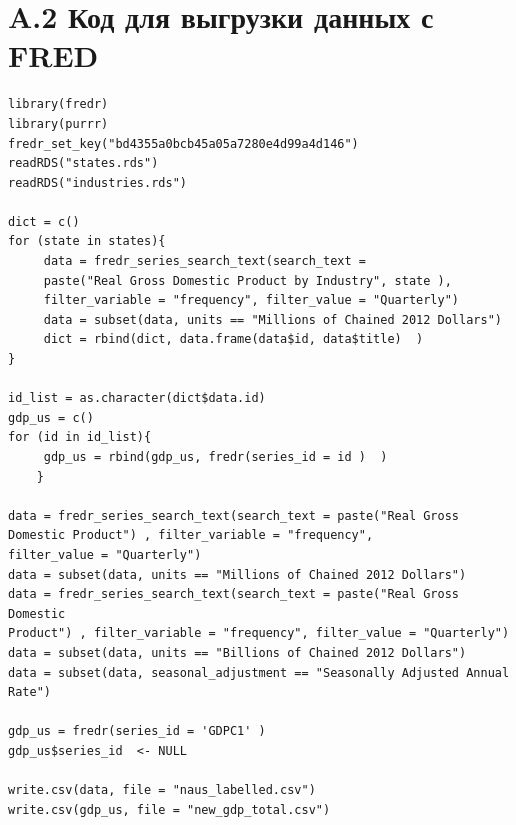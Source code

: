 \documentclass[12pt,a4paper, oneside]{extreport}
\begin{document}
\section*{A.2 Код для выгрузки данных с FRED }

\begin{verbatim}
library(fredr)
library(purrr)
fredr_set_key("bd4355a0bcb45a05a7280e4d99a4d146")
readRDS("states.rds")
readRDS("industries.rds")

dict = c()
for (state in states){
     data = fredr_series_search_text(search_text = 
     paste("Real Gross Domestic Product by Industry", state ), 
     filter_variable = "frequency", filter_value = "Quarterly") 
     data = subset(data, units == "Millions of Chained 2012 Dollars")
     dict = rbind(dict, data.frame(data$id, data$title)  )
}

id_list = as.character(dict$data.id)
gdp_us = c()
for (id in id_list){
     gdp_us = rbind(gdp_us, fredr(series_id = id )  )
	}

data = fredr_series_search_text(search_text = paste("Real Gross 
Domestic Product") , filter_variable = "frequency", 
filter_value = "Quarterly") 
data = subset(data, units == "Millions of Chained 2012 Dollars")
data = fredr_series_search_text(search_text = paste("Real Gross Domestic 
Product") , filter_variable = "frequency", filter_value = "Quarterly") 
data = subset(data, units == "Billions of Chained 2012 Dollars")
data = subset(data, seasonal_adjustment == "Seasonally Adjusted Annual Rate")

gdp_us = fredr(series_id = 'GDPC1' ) 
gdp_us$series_id  <- NULL

write.csv(data, file = "naus_labelled.csv")
write.csv(gdp_us, file = "new_gdp_total.csv")
\end{verbatim}



\newpage
\end{document}
